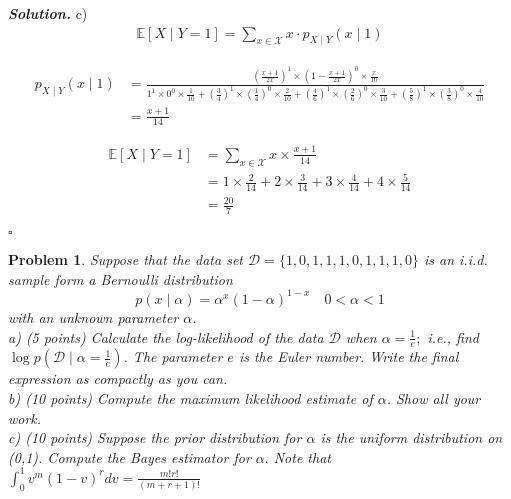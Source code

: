 \documentclass[11pt]{amsart}
\newtheorem{problem}{Problem}
\newenvironment{solution}[1][\it{Solution}]{\textbf{#1. } }{$\square$}
\theoremstyle{definition}
\begin{document}
\begin{solution}
c)
\begin{align*}
\mathbb{E}[X \mid Y=1]=\sum_{x \in \mathcal{X}} x \cdot p_{X \mid Y}(x \mid 1)
\end{align*}

\begin{align*}
p_{X \mid Y}(x \mid 1)&=\frac{\left(\frac{x+1}{2x}\right)^{1} \times\left(1-\frac{x+1}{2 x}\right)^{0} \times \frac{x}{10}}{1^{1} \times 0^{0} \times \frac{1}{10}+\left(\frac{3}{4}\right)^{1} \times\left(\frac{1}{4}\right)^{0} \times \frac{2}{10} + \left(\frac{4}{6}\right)^{1} \times\left(\frac{2}{6}\right)^{0} \times \frac{3}{10} + \left(\frac{5}{8}\right)^{1} \times\left(\frac{3}{8}\right)^{0} \times \frac{4}{10}}\\
&=\frac{x+1}{14}
\end{align*}

\begin{align*}
\mathbb{E}[X \mid Y=1] &= \sum_{x \in \mathcal{X}} x \times \frac{x + 1}{14}\\
&= 1 \times \frac{2}{14} + 2 \times \frac{3}{14} + 3 \times \frac{4}{14} + 4 \times \frac{5}{14}\\
&= \boxed{\frac{20}{7}} 
\end{align*}

\end{solution}



\begin{problem}
Suppose that the data set $\mathcal{D}=\{1,0,1,1,1,0,1,1,1,0\}$ is an i.i.d. sample form a Bernoulli distribution
$$
p(x \mid \alpha)=\alpha^{x}(1-\alpha)^{1-x} \quad 0<\alpha<1
$$
with an unknown parameter $\alpha$.\\
a) (5 points) Calculate the log-likelihood of the data $\mathcal{D}$ when $\alpha=\frac{1}{e} ;$ i.e., find $\log p(\mathcal{D} \mid \alpha=\frac{1}{e})$. The parameter $e$ is the Euler number. Write the final expression as compactly as you can.\\
b) (10 points) Compute the maximum likelihood estimate of $\alpha$. Show all your work.\\
c) (10 points) Suppose the prior distribution for $\alpha$ is the uniform distribution on (0,1).  Compute the Bayes estimator for $\alpha .$ Note that $\int_{0}^{1} v^{m}(1-v)^{r} d v=\frac{m ! r !}{(m+r+1) !}$
\end{problem}
\end{document}
